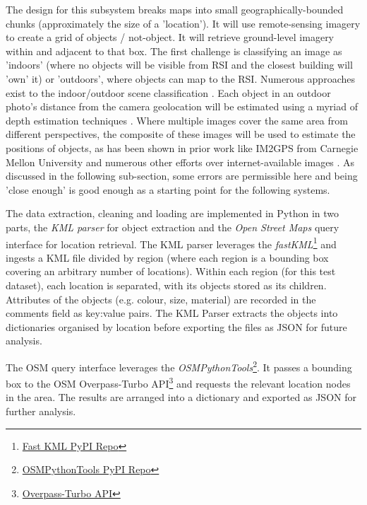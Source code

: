 The design for this subsystem breaks maps into small geographically-bounded chunks (approximately the size of a 'location'). 
It will use remote-sensing imagery to create a grid of objects / not-object. It will retrieve ground-level imagery within and adjacent to that box.
The first challenge is classifying an image as 'indoors' (where no objects will be visible from RSI and the closest building will 'own' it) or 'outdoors', where objects can map to the RSI. Numerous approaches exist to the indoor/outdoor scene classification \cite{Tong2017}. 
Each object in an outdoor photo's distance from the camera geolocation will be estimated using a myriad of depth estimation techniques \cite{Ming2021,Liu2020}. 
Where multiple images cover the same area from different perspectives, the composite of these images will be used to estimate the positions of objects, as has been shown in prior work like IM2GPS from Carnegie Mellon University \cite{Hays2008} and numerous other efforts over internet-available images \cite{Snavely2011}. 
As discussed in the following sub-section, some errors are permissible here and being 'close enough' is good enough as a starting point for the following systems. 





The data extraction, cleaning and loading are implemented in Python in two parts, the \textit{KML parser} for object extraction and the \textit{Open Street Maps} query interface for location retrieval. 
The KML parser leverages the \textit{fastKML}\footnote{\href{https://pypi.org/project/fastkml/}{Fast KML PyPI Repo}} and ingests a KML file divided by region (where each region is a bounding box covering an arbitrary number of locations). 
Within each region (for this test dataset), each location is separated, with its objects stored as its children. 
Attributes of the objects (e.g. colour, size, material) are recorded in the comments field as key:value pairs.
The KML Parser extracts the objects into dictionaries organised by location before exporting the files as JSON for future analysis. 

The OSM query interface leverages the \textit{OSMPythonTools}\footnote{\href{https://pypi.org/project/OSMPythonTools/}{OSMPythonTools PyPI Repo}}. It passes a bounding box to the OSM Overpass-Turbo API\footnote{\href{https://overpass-turbo.eu/}{Overpass-Turbo API}} and requests the relevant location nodes in the area. 
The results are arranged into a dictionary and exported as JSON for further analysis.


